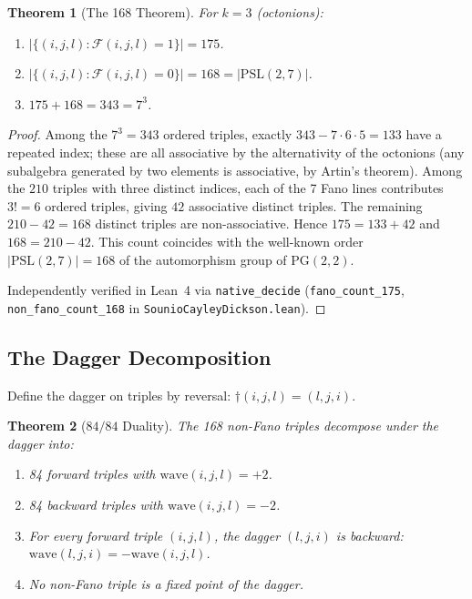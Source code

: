 \documentclass[11pt,a4paper]{article}
\newtheorem{theorem}{Theorem}[section]
\theoremstyle{definition}
\theoremstyle{remark}
\newcommand{\PG}{\mathrm{PG}}
\newcommand{\PSL}{\mathrm{PSL}}
\newcommand{\Fano}{\mathcal{F}}
\newcommand{\wave}{\mathrm{wave}}
\newcommand{\dagop}{{\dagger}}
\begin{document}
\begin{theorem}[The 168 Theorem]\label{thm:168}
For $k = 3$ (octonions):
\begin{enumerate}
\item $|\{(i,j,l) : \Fano(i,j,l) = 1\}| = 175$.
\item $|\{(i,j,l) : \Fano(i,j,l) = 0\}| = 168 = |\PSL(2,7)|$.
\item $175 + 168 = 343 = 7^3$.
\end{enumerate}
\end{theorem}

\begin{proof}
Among the $7^3 = 343$ ordered triples, exactly $343 - 7 \cdot 6 \cdot 5 = 133$
have a repeated index; these are all associative by the alternativity of
the octonions (any subalgebra generated by two elements is associative,
by Artin's theorem). Among the $210$ triples with three distinct indices,
each of the 7 Fano lines contributes $3! = 6$ ordered triples, giving
$42$ associative distinct triples. The remaining $210 - 42 = 168$
distinct triples are non-associative. Hence $175 = 133 + 42$ and
$168 = 210 - 42$. This count coincides with the well-known order
$|\PSL(2,7)| = 168$ of the automorphism group of $\PG(2,2)$.

Independently verified in Lean~4 via \texttt{native\_decide}
(\texttt{fano\_count\_175}, \texttt{non\_fano\_count\_168} in
\texttt{SounioCayleyDickson.lean}).
\end{proof}

\subsection{The Dagger Decomposition}

Define the dagger on triples by reversal: $\dagop(i,j,l) = (l,j,i)$.

\begin{theorem}[$84/84$ Duality]\label{thm:8484}
The 168 non-Fano triples decompose under the dagger into:
\begin{enumerate}
\item 84 \emph{forward} triples with $\wave(i,j,l) = +2$.
\item 84 \emph{backward} triples with $\wave(i,j,l) = -2$.
\item For every forward triple $(i,j,l)$, the dagger
  $(l,j,i)$ is backward: $\wave(l,j,i) = -\wave(i,j,l)$.
\item No non-Fano triple is a fixed point of the dagger.
\end{enumerate}
\end{theorem}
\end{document}
